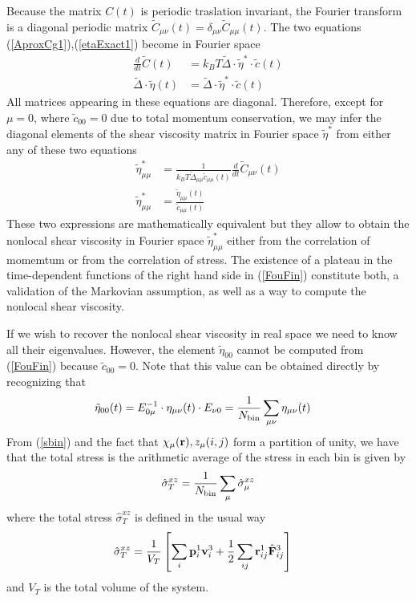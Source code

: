 \documentclass[b5paper,openright,10pt]{book}
\newcommand{\esc}{\!\cdot\!}
\begin{document}
Because  the  matrix  $C(t)$  is periodic  traslation  invariant,  the
Fourier     transform     is     a    diagonal     periodic     matrix
$\tilde{C}_{\mu\nu}(t)=\delta_{\mu\nu}\tilde{C}_{\mu\mu}(t)$.
The two equations (\ref{AproxCg1}),(\ref{etaExact1}) become in Fourier space
\begin{align}
  \frac{d}{dt}\tilde{C}(t)&=  k_BT\tilde{\Delta}\esc \tilde{\eta}^*\esc \tilde{c}(t)
\nonumber\\
 \tilde{\Delta}\esc \tilde{\eta}(t) &=\tilde{\Delta}\esc \tilde{\eta}^*\esc \tilde{c}(t)
\label{Fou1}
\end{align}
All matrices  appearing in  these equations are  diagonal.  Therefore,
except  for $\mu=0$,  where $\tilde{c}_{00}=0$  due to  total momentum
conservation,  we  may  infer  the  diagonal  elements  of  the  shear
viscosity matrix in Fourier space  $\tilde{\eta}^*$ from either any of
these two equations
\begin{align}
  \tilde{\eta}^*_{\mu\mu}&= \frac{1}{ k_BT\tilde{\Delta}_{\mu\mu}  \tilde{c}_{\mu\mu}(t)}\frac{d}{dt}\tilde{C}_{\mu\nu}(t)
\nonumber\\
\tilde{\eta}_{\mu\mu}^*&=\frac{\tilde{\eta}_{\mu\mu}(t) }{\tilde{c}_{\mu\mu}(t)}
\label{FouFin}
\end{align}
These two expressions are mathematically  equivalent but they allow to
obtain   the    nonlocal   shear    viscosity   in    Fourier   space
$\tilde{\eta}_{\mu\mu}^*$ either  from the correlation of  momemtum or
from the  correlation of stress.   The existence  of a plateau  in the
time-dependent  functions of  the  right hand  side in  (\ref{FouFin})
constitute both, a validation of  the Markovian assumption, as well as
a way to compute the nonlocal shear viscosity.

If we wish  to recover the nonlocal shear viscosity  in real space we
need   to  know   all   their  eigenvalues.    However,  the   element
$\tilde{\eta}_{00}$  cannot be  computed  from (\ref{FouFin})  because
$\tilde{c}_{00}=0$.  Note that this value  can be obtained directly by
recognizing that
\begin{align}
    \tilde{\eta}_{00}(t)&=E_{0\mu}^{-1}\cdot\eta_{\mu\nu}(t)\cdot E_{\nu 0}=\frac{1}{N_{\rm bin}}
\sum_{\mu\nu}\eta_{\mu\nu}(t)
\label{eta00}
\end{align}
From
(\ref{sbin}) and the fact that $\chi_\mu({\bf r}),z_{\mu}(i,j)$ form a partition of unity, we have
that the total stress is the arithmetic average of the stress in each bin is given by
\begin{align}
\hat{\sigma}_T^{xz}=\frac{1}{N_{\rm bin}}\sum_\mu\hat{\sigma}_\mu^{xz}
\label{TotStress2}
\end{align}
where the  total stress $\hat\sigma_T^{xz}$ is defined  in the usual way
\begin{align}
\hat{\sigma}_T^{xz}&=\frac{1}{V_T}\left[\sum_{i}{\bf p}^1_i{\bf v}^3_i
+\frac{1}{2}\sum_{ij}{\bf r}^1_{ij}\hat{\bf F}^3_{ij}\right]
\label{TotStress}
\end{align}
and $V_T$ is the total volume of the system. 
\end{document}
